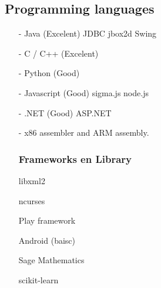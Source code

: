 \documentclass[margin, 10pt]{res} %
\begin{document}
\subsection{Programming languages}
\begin{multicols}{2}
\begin{enumerate}
\item[-] Java (Excelent)
\subitem JDBC
\subitem jbox2d
\subitem Swing
\item[-] C / C++ (Excelent)
\item[-] Python (Good)
\item[-] Javascript (Good)
\subitem sigma.js
\subitem node.js
\item[-] .NET (Good)
\subitem ASP.NET
\item[-] x86 assembler and ARM assembly.

\subsubsection*{Frameworks en Library}
\item[] libxml2
\item[] ncurses
\item[] Play framework
\item[] Android (baisc)
\item[] Sage Mathematics
\item[] scikit-learn
\end{enumerate}
\end{multicols}
\end{document}
